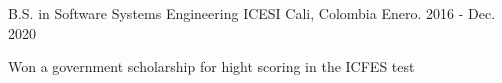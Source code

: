 

\begin{cventries}

  \cventry
    {B.S. in Software Systems Engineering} %
    {ICESI} %
    {Cali, Colombia} %
    {Enero. 2016 - Dec. 2020} %
    {
      \begin{cvitems} %
        \item {Won a government scholarship for hight scoring in the ICFES test}
      \end{cvitems}
    }

\end{cventries}
